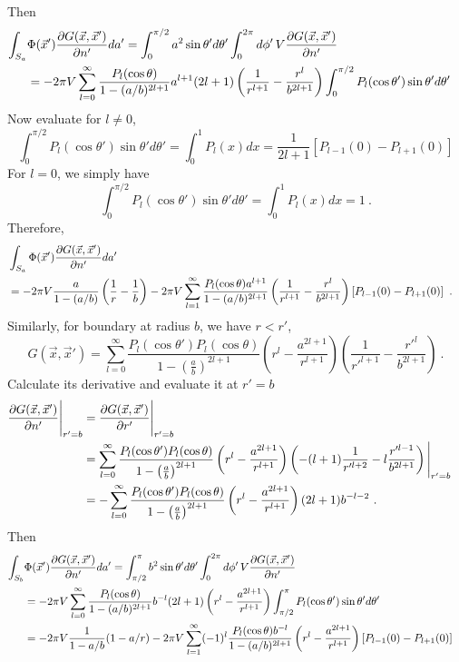 \documentclass[12pt]{article}
\begin{document}
Then
\begin{align}
    \int_{S_a}&\Phi(\vec x') \frac{\partial G(\vec x, \vec x')}{\partial n'}da' = \int_0^{\pi/2} a^2 \sin\theta' d\theta' \int_0^{2\pi} d\phi'\, V \frac{\partial G(\vec x, \vec x')}{\partial n'} \cr
    &= - 2 \pi V \sum_{l=0}^\infty \frac{P_l(\cos \theta)}{1 - (a/b)^{2l+1}} a^{l+1} (2l+1) \left(\frac{1}{r^{l+1}} - \frac{r^l}{b^{2l+1}}\right) \int_0^{\pi/2} P_l(\cos\theta') \sin\theta' d \theta'
\end{align}
Now evaluate for $l \neq 0$,
\begin{equation}
    \int_0^{\pi/2} P_l(\cos \theta') \sin \theta' d \theta' = \int_0^1 P_l(x) dx = \frac{1}{2l+1}\left[P_{l-1}(0) - P_{l+1}(0)\right]
\end{equation}
For $l = 0$, we simply have
\begin{equation}
    \int_0^{\pi/2} P_l(\cos \theta') \sin \theta' d \theta' = \int_0^1 P_l(x) dx = 1~.
\end{equation}
Therefore,
\begin{align}
    &\int_{S_a}\Phi(\vec x') \frac{\partial G(\vec x, \vec x')}{\partial n'}da' \cr
    &= - 2 \pi V \frac{a}{1 - (a/b)} \left(\frac{1}{r} - \frac{1}{b}\right) - 2 \pi V \sum_{l=1}^\infty \frac{P_l(\cos \theta) a^{l+1}}{1 - (a/b)^{2l+1}}   \left(\frac{1}{r^{l+1}} - \frac{r^l}{b^{2l+1}}\right) \left[P_{l-1}(0) - P_{l+1}(0)\right]~.\nonumber
\end{align}
Similarly, for boundary at radius $b$, we have $r < r'$,
\begin{equation}
    G(\vec x, \vec x') = \sum_{l=0}^\infty  \frac{P_l(\cos \theta') P_l(\cos \theta)}{1 - \left(\frac{a}{b}\right)^{2l+1}} \left(r^l - \frac{a^{2l+1}}{r^{l+1}}\right) \left(\frac{1}{r'^{l+1}} - \frac{r'^l}{b^{2l+1}}\right)~.
\end{equation}
Calculate its derivative and evaluate it at $r' = b$
\begin{align}
    \frac{\partial G(\vec x, \vec x')}{\partial n'}\Bigg|_{r' = b} &= \frac{\partial G(\vec x, \vec x')}{\partial r'} \Bigg |_{r' = b} \cr
    &= \sum_{l=0}^\infty  \frac{P_l (\cos \theta')P_l(\cos \theta)}{1-\left(\frac{a}{b}\right)^{2l+1}}\left(r^l - \frac{a^{2l+1}}{r^{l+1}}\right) \left(-(l+1)\frac{1}{r'^{l+2}} - l\frac{r'^{l-1} }{b^{2l+1}}\right) \Bigg |_{r' = b} \cr
    &=- \sum_{l=0}^\infty  \frac{P_l (\cos \theta')P_l(\cos \theta)}{1-\left(\frac{a}{b}\right)^{2l+1}}\left(r^l - \frac{a^{2l+1}}{r^{l+1}}\right) (2l+1) b^{-l-2}~.
\end{align}
Then
\begin{align}
    \int_{S_b}&\Phi(\vec x') \frac{\partial G(\vec x, \vec x')}{\partial n'}da' = \int_{\pi/2}^\pi b^2 \sin\theta' d\theta' \int_0^{2\pi} d\phi'\, V \frac{\partial G(\vec x, \vec x')}{\partial n'} \cr
    &= - 2 \pi V \sum_{l=0}^\infty \frac{P_l(\cos \theta)}{1 - (a/b)^{2l+1}} b^{-l} (2l+1) \left(r^l - \frac{a^{2l+1}}{r^{l+1}}\right) \int_{\pi/2}^\pi P_l(\cos\theta') \sin\theta' d \theta'\cr
    &= -2\pi V \frac{1}{1-a/b}(1-a/r) - 2\pi V \sum_{l=1}^\infty (-1)^l \frac{P_l(\cos \theta) b^{-l}}{1-(a/b)^{2l+1}} \left(r^l - \frac{a^{2l+1}}{r^{l+1}}\right)[P_{l-1}(0) - P_{l+1}(0)]\nonumber
\end{align}
\end{document}
